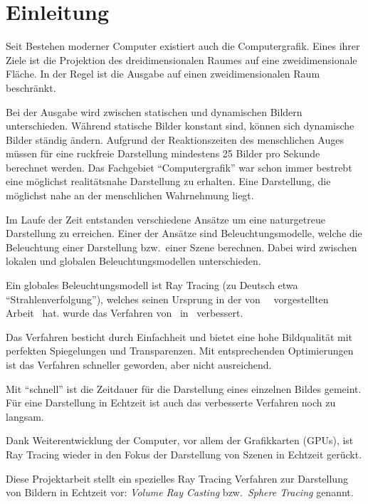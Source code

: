 
\chapter{Einleitung}
\label{chap:10_introduction}

Seit Bestehen moderner Computer existiert auch die Computergrafik.
Eines ihrer Ziele ist die Projektion des dreidimensionalen Raumes auf
eine zweidimensionale Fläche. In der Regel ist die Ausgabe auf einen
zweidimensionalen Raum beschränkt.

Bei der Ausgabe wird zwischen statischen und dynamischen Bildern
unterschieden. Während statische Bilder konstant sind, können sich
dynamische Bilder ständig ändern. Aufgrund der Reaktionszeiten des
menschlichen Auges müssen für eine ruckfreie Darstellung mindestens 25
Bilder pro Sekunde berechnet werden.
Das Fachgebiet ``Computergrafik'' war schon immer bestrebt eine
möglichst realitätsnahe Darstellung zu erhalten. Eine Darstellung, die
möglichst nahe an der menschlichen Wahrnehmung liegt.

Im Laufe der Zeit entstanden verschiedene Ansätze um eine naturgetreue
Darstellung zu erreichen. Einer der Ansätze sind Beleuchtungsmodelle,
welche die Beleuchtung einer Darstellung bzw.\ einer Szene berechnen.
Dabei wird zwischen lokalen und globalen Beleuchtungsmodellen
unterschieden.

Ein globales Beleuchtungsmodell ist Ray Tracing (zu Deutsch etwa
``Strahlenverfolgung''), welches seinen Ursprung in der
von~\citeauthor{appel_techniques_1968}~\citeyear{appel_techniques_1968}
vorgestellten Arbeit~ hat.
\citeyear{whitted_improved_1980} wurde das Verfahren
von~\citeauthor{whitted_improved_1980}
in~ verbessert.

Das Verfahren besticht durch Einfachheit und bietet eine hohe
Bildqualität mit perfekten Spiegelungen und Transparenzen. Mit
entsprechenden Optimierungen ist das Verfahren schneller geworden, aber
nicht ausreichend.

Mit ``schnell'' ist die Zeitdauer für die Darstellung eines einzelnen
Bildes gemeint. Für eine Darstellung in Echtzeit ist auch das
verbesserte Verfahren noch zu langsam.

Dank Weiterentwicklung der Computer, vor allem der Grafikkarten (GPUs),
ist Ray Tracing wieder in den Fokus der Darstellung von Szenen in
Echtzeit gerückt.

Diese Projektarbeit stellt ein spezielles Ray Tracing Verfahren zur
Darstellung von Bildern in Echtzeit vor: \textit{Volume Ray Casting}
bzw.~\textit{Sphere Tracing} genannt.
